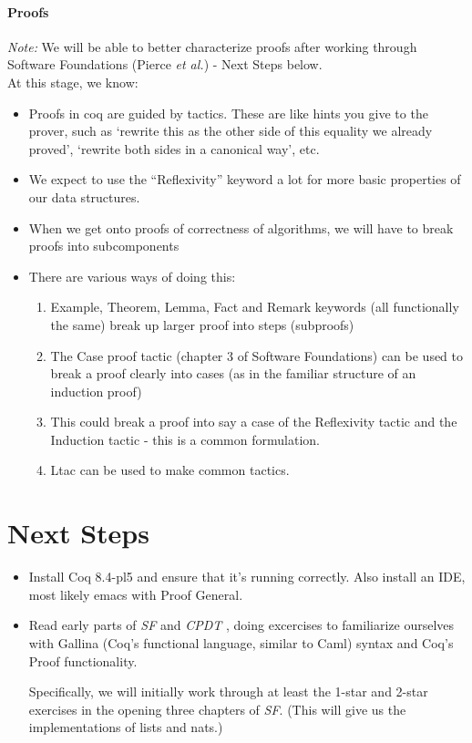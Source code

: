 \documentclass{article}
\begin{document}
\paragraph{Proofs}  %
\emph{Note:} We will be able to better characterize proofs after
working through Software Foundations (Pierce \emph{et al.}) - Next
Steps below.\\
At this stage, we know:
\begin{itemize}
\item Proofs in coq are guided by tactics. These are like hints you
  give to the prover, such as ‘rewrite this as the other side of this
  equality we already proved’, ‘rewrite both sides in a canonical
  way’,  etc.
\item We expect to use the ``Reflexivity'' keyword a lot for more
  basic properties of our data structures.
\item When we get onto proofs of correctness of algorithms, we will
  have to break proofs into subcomponents
\item There are various ways of doing this:
\begin{enumerate}
\item Example, Theorem, Lemma, Fact and Remark keywords (all
  functionally the same) break up larger proof into steps (subproofs)
\item The Case proof tactic (chapter 3 of Software Foundations) can be
  used to break a proof clearly into cases (as in the familiar
  structure of an induction proof)
\item This could break a proof into say a case of the Reflexivity
  tactic and the Induction tactic - this is a common formulation.
\item Ltac can be used to make common tactics.
\end{enumerate}

\end{itemize}

\section{Next Steps}
\begin{itemize}
  \item
    Install Coq 8.4-pl5 and ensure that it's running correctly.
    Also install an IDE, most likely emacs with Proof General.
  \item
    Read early parts of \emph{SF} \cite{sf} and \emph{CPDT} \cite{cpdt},
    doing excercises to familiarize ourselves with Gallina (Coq's functional
    language, similar to Caml) syntax and Coq's Proof functionality.

    Specifically, we will initially work through at least the 1-star and
    2-star exercises in the opening three chapters of \emph{SF}.
    (This will give us the implementations of lists and nats.)
\end{itemize}
\end{document}
